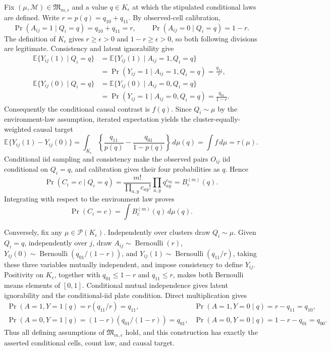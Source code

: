 Fix \((\mu,\mathcal M)\in\mathfrak M_{m,\epsilon}\) and a value \(q\in K_{\epsilon}\) at which the stipulated conditional laws are defined.  Write \(r=p(q)=q_{10}+q_{11}\).  By observed-cell calibration,
\[
 \Pr(A_{ij}=1\mid Q_i=q)=q_{10}+q_{11}=r,
 \qquad
 \Pr(A_{ij}=0\mid Q_i=q)=1-r.
\]
The definition of \(K_{\epsilon}\) gives \(r\geq\epsilon>0\) and \(1-r\geq\epsilon>0\), so both following divisions are legitimate.  Consistency and latent ignorability give
\[
 \begin{aligned}
 \mathbb E\{Y_{ij}(1)\mid Q_i=q\}
 &=\mathbb E\{Y_{ij}(1)\mid A_{ij}=1,Q_i=q\}\\
 &=\Pr(Y_{ij}=1\mid A_{ij}=1,Q_i=q)=\frac{q_{11}}{r},\\
 \mathbb E\{Y_{ij}(0)\mid Q_i=q\}
 &=\mathbb E\{Y_{ij}(0)\mid A_{ij}=0,Q_i=q\}\\
 &=\Pr(Y_{ij}=1\mid A_{ij}=0,Q_i=q)=\frac{q_{01}}{1-r}.
 \end{aligned}
\]
Consequently the conditional causal contrast is \(f(q)\).  Since \(Q_i\sim\mu\) by the environment-law assumption, iterated expectation yields the cluster-equally-weighted causal target
\[
 \mathbb E\{Y_{ij}(1)-Y_{ij}(0)\}
 =\int_{K_{\epsilon}}\left\{\frac{q_{11}}{p(q)}-\frac{q_{01}}{1-p(q)}\right\}\,d\mu(q)
 =\int f\,d\mu=\tau(\mu).
\]
Conditional iid sampling and consistency make the observed pairs \(O_{ij}\) iid conditional on \(Q_i=q\), and calibration gives their four probabilities as \(q\).  Hence
\[
 \Pr(C_i=c\mid Q_i=q)
 =\frac{m!}{\prod_{a,y}c_{ay}!}\prod_{a,y}q_{ay}^{c_{ay}}
 =B_c^{(m)}(q).
\]
Integrating with respect to the environment law proves
\[
 \Pr(C_i=c)=\int B_c^{(m)}(q)\,d\mu(q).
\]

Conversely, fix any \(\mu\in\mathcal P(K_{\epsilon})\).  Independently over clusters draw \(Q_i\sim\mu\).  Given \(Q_i=q\), independently over \(j\), draw \(A_{ij}\sim\operatorname{Bernoulli}(r)\), \(Y_{ij}(0)\sim\operatorname{Bernoulli}(q_{01}/(1-r))\), and \(Y_{ij}(1)\sim\operatorname{Bernoulli}(q_{11}/r)\), taking these three variables mutually independent, and impose consistency to define \(Y_{ij}\).  Positivity on \(K_{\epsilon}\), together with \(q_{01}\leq1-r\) and \(q_{11}\leq r\), makes both Bernoulli means elements of \([0,1]\).  Conditional mutual independence gives latent ignorability and the conditional-iid plate condition.  Direct multiplication gives
\[
 \begin{array}{ll}
 \Pr(A=1,Y=1\mid q)=r(q_{11}/r)=q_{11},
 &\Pr(A=1,Y=0\mid q)=r-q_{11}=q_{10},\\
 \Pr(A=0,Y=1\mid q)=(1-r)(q_{01}/(1-r))=q_{01},
 &\Pr(A=0,Y=0\mid q)=1-r-q_{01}=q_{00}.
 \end{array}
\]
Thus all defining assumptions of \(\mathfrak M_{m,\epsilon}\) hold, and this construction has exactly the asserted conditional cells, count law, and causal target.